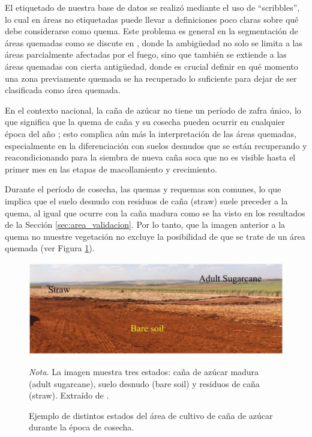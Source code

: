 El etiquetado de nuestra base de datos se realizó mediante el uso de “scribbles”, lo cual en áreas no etiquetadas puede llevar a definiciones poco claras sobre qué debe 
considerarse como quema. Este problema es general en la segmentación de áreas quemadas como se discute en \citet{knopp_deep_2020}, 
donde la ambigüedad no solo se limita a las áreas parcialmente afectadas por el fuego, sino que también se extiende a las áreas quemadas con cierta antigüedad, donde es crucial 
definir en qué momento una zona previamente quemada se ha recuperado lo suficiente para dejar de ser clasificada como área quemada.

En el contexto nacional, la caña de azúcar no tiene un período de zafra único, lo que significa que la quema de caña y su cosecha pueden ocurrir en cualquier época del año \citep{helfgott_cultivo_2016};
esto complica aún más la interpretación de las áreas quemadas, especialmente en la diferenciación con suelos desnudos que se están recuperando y reacondicionando para la siembra de nueva caña soca que no es
visible hasta el primer mes en las etapas de macollamiento y crecimiento. 

Durante el período de cosecha, las quemas y requemas son comunes, lo que implica que el suelo desnudo con residuos de caña (straw) suele preceder a la quema, al igual que ocurre con la caña madura como se ha visto
en los resultados de la Sección \ref{sec:area_validacion}. Por lo tanto, que la imagen anterior a la quema no muestre vegetación no excluye la posibilidad de que se trate de un área quemada (ver Figura \ref{fig:caña}). 

\begin{figure}[H]
    \centering    
    \caption{Ejemplo de distintos estados del área de cultivo de caña de azúcar durante la época de cosecha.}
    \includegraphics[width=1\textwidth]{img/8_capitulo6/posibilidades.png}
    \label{fig:caña}
    \begin{flushleft}
        \vspace{-\baselineskip}
        \textit{Nota.} La imagen muestra tres estados: caña de azúcar madura (adult sugarcane), suelo desnudo (bare soil) y residuos de caña (straw). Extraído de \citet{campos_detection_2022}.
        \vspace{-\baselineskip}
    \end{flushleft}
\end{figure}

